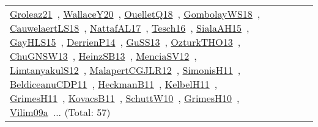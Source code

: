 {\begin{longtable}{lp{3cm}>{\raggedright\arraybackslash}p{6cm}>{\raggedright\arraybackslash}p{6cm}>{\raggedright\arraybackslash}p{8cm}}
\href{works/Groleaz21.pdf}{Groleaz21}~\cite{Groleaz21}, \href{works/WallaceY20.pdf}{WallaceY20}~\cite{WallaceY20}, \href{works/OuelletQ18.pdf}{OuelletQ18}~\cite{OuelletQ18}, \href{works/GombolayWS18.pdf}{GombolayWS18}~\cite{GombolayWS18}, \href{works/CauwelaertLS18.pdf}{CauwelaertLS18}~\cite{CauwelaertLS18}, \href{works/NattafAL17.pdf}{NattafAL17}~\cite{NattafAL17}, \href{works/Tesch16.pdf}{Tesch16}~\cite{Tesch16}, \href{works/SialaAH15.pdf}{SialaAH15}~\cite{SialaAH15}, \href{works/GayHLS15.pdf}{GayHLS15}~\cite{GayHLS15}, \href{works/DerrienP14.pdf}{DerrienP14}~\cite{DerrienP14}, \href{works/GuSS13.pdf}{GuSS13}~\cite{GuSS13}, \href{works/OzturkTHO13.pdf}{OzturkTHO13}~\cite{OzturkTHO13}, \href{works/ChuGNSW13.pdf}{ChuGNSW13}~\cite{ChuGNSW13}, \href{works/HeinzSB13.pdf}{HeinzSB13}~\cite{HeinzSB13}, \href{works/MenciaSV12.pdf}{MenciaSV12}~\cite{MenciaSV12}, \href{works/LimtanyakulS12.pdf}{LimtanyakulS12}~\cite{LimtanyakulS12}, \href{works/MalapertCGJLR12.pdf}{MalapertCGJLR12}~\cite{MalapertCGJLR12}, \href{works/SimonisH11.pdf}{SimonisH11}~\cite{SimonisH11}, \href{works/BeldiceanuCDP11.pdf}{BeldiceanuCDP11}~\cite{BeldiceanuCDP11}, \href{works/HeckmanB11.pdf}{HeckmanB11}~\cite{HeckmanB11}, \href{works/KelbelH11.pdf}{KelbelH11}~\cite{KelbelH11}, \href{works/GrimesH11.pdf}{GrimesH11}~\cite{GrimesH11}, \href{works/KovacsB11.pdf}{KovacsB11}~\cite{KovacsB11}, \href{works/SchuttW10.pdf}{SchuttW10}~\cite{SchuttW10}, \href{works/GrimesH10.pdf}{GrimesH10}~\cite{GrimesH10}, \href{works/Vilim09a.pdf}{Vilim09a}~\cite{Vilim09a}... (Total: 57)\\

\end{longtable}}
